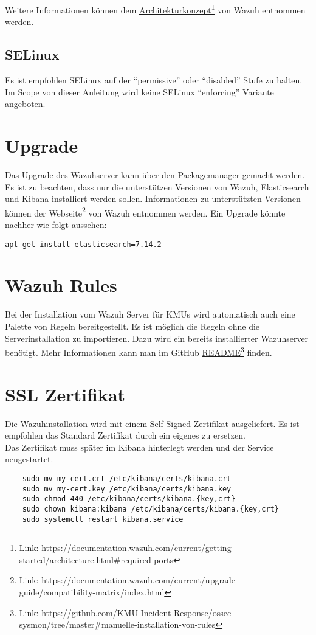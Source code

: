 Weitere Informationen können dem \href{https://documentation.wazuh.com/current/getting-started/architecture.html\#required-ports}{Architekturkonzept}\footnote{Link: https://documentation.wazuh.com/current/getting-started/architecture.html\#required-ports} von Wazuh entnommen werden.\\


\subsection{SELinux}
Es ist empfohlen SELinux auf der ``permissive'' oder ``disabled'' Stufe zu halten. Im Scope von dieser Anleitung wird keine SELinux ``enforcing'' Variante angeboten.

\section{Upgrade}
Das Upgrade des Wazuhserver kann über den Packagemanager gemacht werden.
Es ist zu beachten, dass nur die unterstützen Versionen von Wazuh, Elasticsearch und Kibana installiert werden sollen.
Informationen zu unterstützten Versionen können der \href{https://documentation.wazuh.com/current/upgrade-guide/compatibility-matrix/index.html}{Webseite}\footnote{Link: https://documentation.wazuh.com/current/upgrade-guide/compatibility-matrix/index.html} von Wazuh entnommen werden. Ein Upgrade könnte nachher wie folgt aussehen:
\begin{lstlisting}
apt-get install elasticsearch=7.14.2
\end{lstlisting}


\section{Wazuh Rules}
Bei der Installation vom Wazuh Server für KMUs wird automatisch auch eine Palette von Regeln bereitgestellt.
Es ist möglich die Regeln ohne die Serverinstallation zu importieren.
Dazu wird ein bereits installierter Wazuhserver benötigt.
Mehr Informationen kann man im GitHub \href{https://github.com/KMU-Incident-Response/ossec-sysmon/tree/master\#manuelle-installation-von-rules}{README}\footnote{Link: https://github.com/KMU-Incident-Response/ossec-sysmon/tree/master\#manuelle-installation-von-rules} finden.

\section{SSL Zertifikat}
Die Wazuhinstallation wird mit einem Self-Signed Zertifikat ausgeliefert.
Es ist empfohlen das Standard Zertifikat durch ein eigenes zu ersetzen.\\

Das Zertifikat muss später im Kibana hinterlegt werden und der Service neugestartet.

\begin{lstlisting}
    sudo mv my-cert.crt /etc/kibana/certs/kibana.crt
    sudo mv my-cert.key /etc/kibana/certs/kibana.key
    sudo chmod 440 /etc/kibana/certs/kibana.{key,crt}
    sudo chown kibana:kibana /etc/kibana/certs/kibana.{key,crt}
    sudo systemctl restart kibana.service
\end{lstlisting}